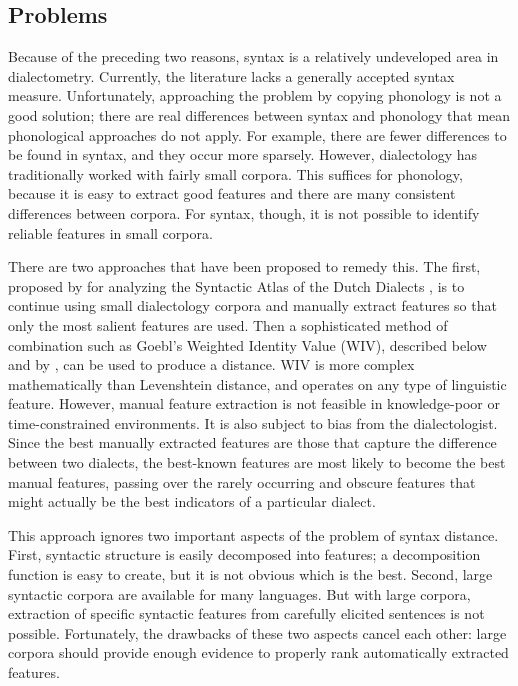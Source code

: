 \subsection{Problems}

Because of the preceding two reasons, syntax is a relatively
undeveloped area in dialectometry. Currently, the literature lacks a
generally accepted syntax measure. Unfortunately, approaching the
problem by copying phonology is not a good solution; there are real
differences between syntax and phonology that mean phonological
approaches do not apply. For example, there are fewer differences to be
found in syntax, and they occur more sparsely.
However, dialectology has traditionally worked with fairly small
corpora. This suffices for phonology, because
it is easy to extract good features and there are many
consistent differences between corpora. For syntax, though, it is not possible
to identify reliable features in small corpora.

There are two approaches that have been proposed to remedy this. The
first, proposed by  for analyzing the Syntactic
Atlas of the Dutch Dialects \cite{barbiers05}, is to continue using
small dialectology corpora and manually extract features so that only
the most salient features are used. Then a sophisticated method of
combination such as Goebl's Weighted Identity Value (WIV), described
below and by , can be used to produce a
distance. WIV is more complex mathematically than Levenshtein
distance, and operates on any type of linguistic feature. However, manual feature
extraction is not feasible in knowledge-poor or time-constrained
environments. It is also subject to bias from the
dialectologist. Since the best manually extracted features are those that capture
the difference between two dialects, the best-known features are most
likely to become the best manual features, passing over the rarely
occurring and obscure features that might actually be the best
indicators of a particular dialect.

This approach ignores two important aspects of the problem of syntax
distance. First, syntactic structure is easily decomposed into
features; a decomposition function is easy to create, but it is not
obvious which is the best.
Second, large syntactic corpora are
available for many languages. But with large corpora, extraction of specific
syntactic features from carefully elicited sentences is not
possible. Fortunately, the drawbacks of these two aspects cancel each other:
large corpora should provide enough evidence to properly rank
automatically extracted features.

